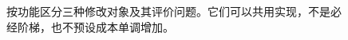 \begin{figure}[htbp]
\centering

\caption{按功能区分三种修改对象及其评价问题。它们可以共用实现，不是必经阶梯，也不预设成本单调增加。}
\label{fig:ch12-meta}
\end{figure}
